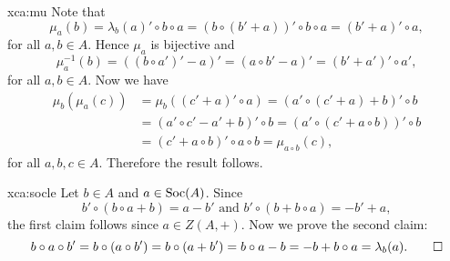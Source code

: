 \begin{sol}{xca:mu}
    Note that
    \[\mu_a(b)=\lambda_b(a)'\circ b\circ a=(b\circ (b'+a))'\circ b\circ a=(b'+a)'\circ a,\]
    for all $a,b\in A$. Hence $\mu_a$ is bijective and
    \[\mu_a^{-1}(b)=((b\circ a')'-a)'=(a\circ b'-a)'=(b'+a')'\circ a',\]
    for all $a,b\in A$. Now we have
    \begin{align*}
        \mu_b(\mu_a(c))&=\mu_b((c'+a)'\circ a)=(a'\circ (c'+a)+b)'\circ b\\
        &=(a'\circ c'-a'+b)'\circ b=(a'\circ (c'+a\circ b))'\circ b\\
        &=(c'+a\circ b)'\circ a\circ b=\mu_{a\circ b}(c),
    \end{align*}
    for all $a,b,c\in A$. Therefore the result follows.
\end{sol}

\begin{sol}{xca:socle}
    Let $b\in A$ and $a\in\operatorname{Soc}(A)$. Since   
    \[
    b'\circ (b\circ a+b)=a-b'
    \text{ and }
    b'\circ (b+b\circ a)=-b'+a,
    \]
    the first claim follows since
    $a\in Z(A,+)$.
    Now we prove the second claim:
    \[
    b\circ a\circ b'=b\circ (a\circ b')=b\circ (a+b')=b\circ a-b=-b+b\circ
    a=\lambda_b(a).\qedhere
    \]
\end{sol}